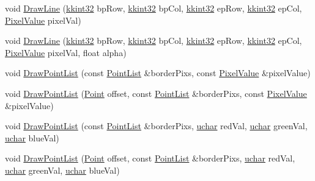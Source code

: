 \begin{DoxyCompactItemize}
void \hyperlink{class_k_k_b_1_1_raster_a28fbbdb8290487d13725ce4610a030c1}{Draw\+Line} (\hyperlink{namespace_k_k_b_a8fa4952cc84fda1de4bec1fbdd8d5b1b}{kkint32} bp\+Row, \hyperlink{namespace_k_k_b_a8fa4952cc84fda1de4bec1fbdd8d5b1b}{kkint32} bp\+Col, \hyperlink{namespace_k_k_b_a8fa4952cc84fda1de4bec1fbdd8d5b1b}{kkint32} ep\+Row, \hyperlink{namespace_k_k_b_a8fa4952cc84fda1de4bec1fbdd8d5b1b}{kkint32} ep\+Col, \hyperlink{class_k_k_b_1_1_pixel_value}{Pixel\+Value} pixel\+Val)
\item 
void \hyperlink{class_k_k_b_1_1_raster_a3348d6cd4db5b01284004cc20d411dc4}{Draw\+Line} (\hyperlink{namespace_k_k_b_a8fa4952cc84fda1de4bec1fbdd8d5b1b}{kkint32} bp\+Row, \hyperlink{namespace_k_k_b_a8fa4952cc84fda1de4bec1fbdd8d5b1b}{kkint32} bp\+Col, \hyperlink{namespace_k_k_b_a8fa4952cc84fda1de4bec1fbdd8d5b1b}{kkint32} ep\+Row, \hyperlink{namespace_k_k_b_a8fa4952cc84fda1de4bec1fbdd8d5b1b}{kkint32} ep\+Col, \hyperlink{class_k_k_b_1_1_pixel_value}{Pixel\+Value} pixel\+Val, float alpha)
\item 
void \hyperlink{class_k_k_b_1_1_raster_a7afa361fd71c5eaad80941bece5f68a1}{Draw\+Point\+List} (const \hyperlink{class_k_k_b_1_1_point_list}{Point\+List} \&border\+Pixs, const \hyperlink{class_k_k_b_1_1_pixel_value}{Pixel\+Value} \&pixel\+Value)
\item 
void \hyperlink{class_k_k_b_1_1_raster_a204938dab72379d43cd231d67ed1241e}{Draw\+Point\+List} (\hyperlink{class_k_k_b_1_1_point}{Point} offset, const \hyperlink{class_k_k_b_1_1_point_list}{Point\+List} \&border\+Pixs, const \hyperlink{class_k_k_b_1_1_pixel_value}{Pixel\+Value} \&pixel\+Value)
\item 
void \hyperlink{class_k_k_b_1_1_raster_a2de3887292960a46cfb2af7b8d10f51e}{Draw\+Point\+List} (const \hyperlink{class_k_k_b_1_1_point_list}{Point\+List} \&border\+Pixs, \hyperlink{namespace_k_k_b_ace9969169bf514f9ee6185186949cdf7}{uchar} red\+Val, \hyperlink{namespace_k_k_b_ace9969169bf514f9ee6185186949cdf7}{uchar} green\+Val, \hyperlink{namespace_k_k_b_ace9969169bf514f9ee6185186949cdf7}{uchar} blue\+Val)
\item 
void \hyperlink{class_k_k_b_1_1_raster_a2db797acdc478931e0a5f65509330445}{Draw\+Point\+List} (\hyperlink{class_k_k_b_1_1_point}{Point} offset, const \hyperlink{class_k_k_b_1_1_point_list}{Point\+List} \&border\+Pixs, \hyperlink{namespace_k_k_b_ace9969169bf514f9ee6185186949cdf7}{uchar} red\+Val, \hyperlink{namespace_k_k_b_ace9969169bf514f9ee6185186949cdf7}{uchar} green\+Val, \hyperlink{namespace_k_k_b_ace9969169bf514f9ee6185186949cdf7}{uchar} blue\+Val)
\item 

\end{DoxyCompactItemize}
